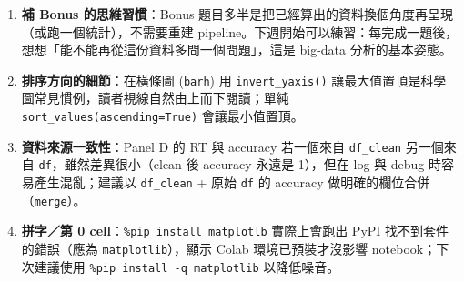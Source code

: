 \documentclass[
  14pt,
]{extarticle}
\providecommand{\tightlist}{%
  \setlength{\itemsep}{0pt}\setlength{\parskip}{0pt}}
\begin{document}
\begin{enumerate}
\def\labelenumi{\arabic{enumi}.}
\tightlist
\item
  \textbf{補 Bonus 的思維習慣}：Bonus
  題目多半是把已經算出的資料換個角度再呈現（或跑一個統計），不需要重建
  pipeline。下週開始可以練習：每完成一題後，想想「能不能再從這份資料多問一個問題」，這是
  big-data 分析的基本姿態。
\item
  \textbf{排序方向的細節}：在橫條圖 (\texttt{barh}) 用
  \texttt{invert\_yaxis()}
  讓最大值置頂是科學圖常見慣例，讀者視線自然由上而下閱讀；單純
  \texttt{sort\_values(ascending=True)} 會讓最小值置頂。
\item
  \textbf{資料來源一致性}：Panel D 的 RT 與 accuracy 若一個來自
  \texttt{df\_clean} 另一個來自 \texttt{df}，雖然差異很小（clean 後
  accuracy 永遠是 1），但在 log 與 debug 時容易產生混亂；建議以
  \texttt{df\_clean} + 原始 \texttt{df} 的 accuracy
  做明確的欄位合併（\texttt{merge}）。
\item
  \textbf{拼字／第 0 cell}：\texttt{\%pip\ install\ matplotlb}
  實際上會跑出 PyPI 找不到套件的錯誤（應為 \texttt{matplotlib}），顯示
  Colab 環境已預裝才沒影響 notebook；下次建議使用
  \texttt{\%pip\ install\ -q\ matplotlib} 以降低噪音。
\end{enumerate}
\end{document}

